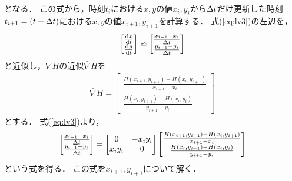 となる． 
この式から，時刻$t_i$における$x,y$の値$x_i,y_i$から$\Delta t$だけ更新した時刻$t_{i+1} = (t + \Delta t)$における$x,y$の値$x_{i+1},y_{i+1}$を計算する．
式(\ref{eq:lv3})の左辺を，
\begin{align}
    \begin{bmatrix}
        \frac{\mathrm{d}x}{\mathrm{d}t} \\ 
        \frac{\mathrm{d}y}{\mathrm{d}t}
    \end{bmatrix}
     \backsimeq 
    \begin{bmatrix}
        \frac{x_{i+1} - x_i}{\Delta t} \\
         \frac{y_{i+1} - y_i}{\Delta t}
    \end{bmatrix}
\end{align}
と近似し，$\nabla H$の近似$\bar{\nabla}H$を
\begin{align}
    \bar{\nabla}H = 
    \begin{bmatrix}
        \frac{H(x_{i+1},y_{i+1}) - H(x_i,y_{i+1})}{x_{i+1} - x_i} \\
        \frac{H(x_{i},y_{i+1}) - H(x_i,y_i)}{y_{i+1} - y_i}
    \end{bmatrix}
\end{align}
とする．
式(\ref{eq:lv3})より，
\begin{align}
    \begin{bmatrix}
        \frac{x_{i+1} - x_i}{\Delta t} \\
         \frac{y_{i+1} - y_i}{\Delta t}
    \end{bmatrix}
    = 
    \begin{bmatrix}
        0 & -x_i y_i \\
        x_i y_i & 0
    \end{bmatrix}
    \begin{bmatrix}
        \frac{H(x_{i+1},y_{i+1}) - H(x_i,y_{i+1})}{x_{i+1} - x_i} \\
        \frac{H(x_{i},y_{i+1}) - H(x_i,y_i)}{y_{i+1} - y_i}
    \end{bmatrix}
\end{align}
という式を得る．
この式を$x_{i+1},y_{i+1}$について解く．